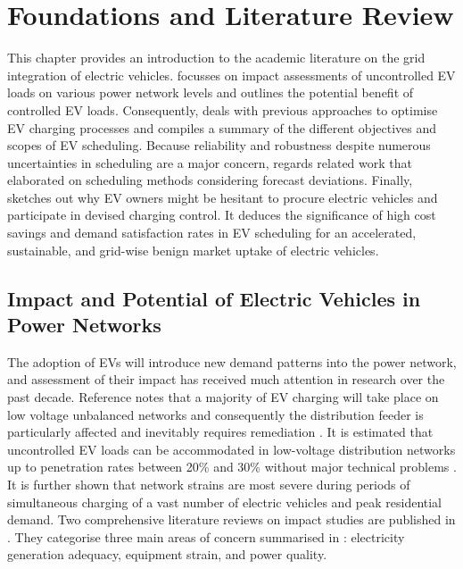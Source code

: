 \chapter{Foundations and Literature Review}
\label{sec:found}

This chapter provides an introduction to the academic literature on the grid integration of electric vehicles.  focusses on impact assessments of uncontrolled EV loads on various power network levels and outlines the potential benefit of controlled EV loads. Consequently,  deals with previous approaches to optimise EV charging processes and compiles a summary of the different objectives and scopes of EV scheduling. Because reliability and robustness despite numerous uncertainties in scheduling are a major concern,  regards related work that elaborated on scheduling methods considering forecast deviations. Finally,  sketches out why EV owners might be hesitant to procure electric vehicles and participate in devised charging control. It deduces the significance of high cost savings and demand satisfaction rates in EV scheduling for an accelerated, sustainable, and grid-wise benign market uptake of electric vehicles.

\section{Impact and Potential of Electric Vehicles in Power Networks}
\label{sec:impact}

The adoption of EVs will introduce new demand patterns into the power network, and assessment of their impact has received much attention in research over the past decade. Reference \cite{OConnell2014} notes that a majority of EV charging will take place on low voltage unbalanced networks and consequently the distribution feeder is particularly affected and inevitably requires remediation \cite{Ochoa2012, Lakervi2007}. It is estimated that uncontrolled EV loads can be accommodated in low-voltage distribution networks up to penetration rates between 20\% and 30\% without major technical problems \cite{Taylor2009, Quiros-Tortos2016, Richardson2010}. It is further shown that network strains are most severe during periods of simultaneous charging of a vast number of electric vehicles and peak residential demand. Two comprehensive literature reviews on impact studies are published in \cite{Papadopoulos2012, Dubey2015}. They categorise three main areas of concern summarised in : electricity generation adequacy, equipment strain, and power quality.

